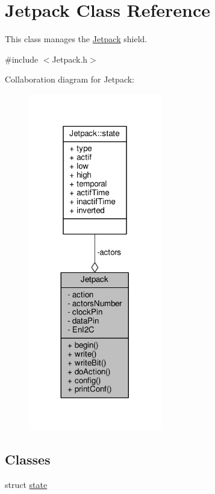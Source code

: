 \hypertarget{classJetpack}{}\section{Jetpack Class Reference}
\label{classJetpack}


This class manages the \hyperlink{classJetpack}{Jetpack} shield.  




{\ttfamily \#include $<$Jetpack.\+h$>$}



Collaboration diagram for Jetpack\+:
\nopagebreak
\begin{figure}[H]
\begin{center}
\leavevmode
\includegraphics[width=164pt]{classJetpack__coll__graph}
\end{center}
\end{figure}
\subsection*{Classes}
\begin{DoxyCompactItemize}
\item 
struct \hyperlink{structJetpack_1_1state}{state}
\end{DoxyCompactItemize}

